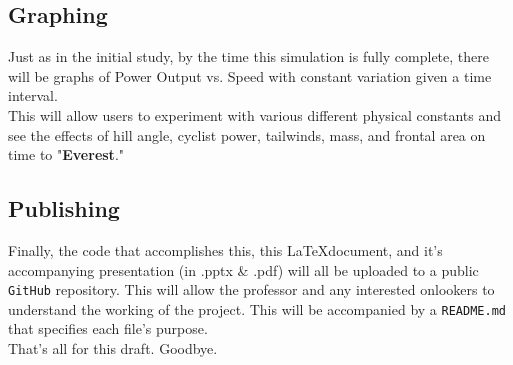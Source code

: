 \documentclass[twocolumn]{article}
\newcommand{\n}{\vspace{0.15cm}\\}
\begin{document}
\subsection{Graphing}
Just as in the initial study, by the time this simulation is fully complete, there will be graphs of Power Output vs. Speed with constant variation given a time interval.\\
This will allow users to experiment with various different physical constants and see the effects of hill angle, cyclist power, tailwinds, mass, and frontal area on time to "\textbf{Everest}."
\subsection{Publishing}
Finally, the code that accomplishes this, this \LaTeX\;document, and it's accompanying presentation (in .pptx \& .pdf) will all be uploaded to a public \texttt{GitHub} repository.
This will allow the professor and any interested onlookers to understand the working of the project. This will be accompanied by a \texttt{README.md} that specifies each file's purpose.\n
That's all for this draft. Goodbye.
\end{document}
